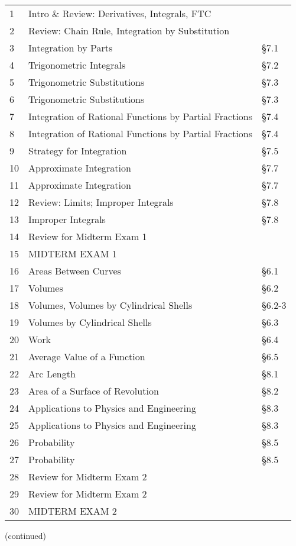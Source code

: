 \documentclass[11pt]{article}
\begin{document}
\begin{tabular}{|l|l|l|}
1 & Intro \& Review: Derivatives, Integrals, FTC & \\
2 & Review: Chain Rule, Integration by Substitution & \\
3 &Integration by Parts  & \S7.1 \\
4 &Trigonometric Integrals & \S 7.2 \\
5&Trigonometric Substitutions& \S7.3 \\
6&Trigonometric Substitutions& \S7.3 \\
7& Integration of Rational Functions by Partial Fractions& \S7.4 \\ 
8& Integration of Rational Functions by Partial Fractions& \S7.4 \\ 
9&Strategy for Integration& \S7.5 \\
10&Approximate Integration& \S7.7 \\
11&Approximate Integration& \S7.7 \\ 
12&Review: Limits; Improper Integrals& \S7.8 \\
13 &Improper Integrals& \S7.8 \\ 
14& Review for Midterm Exam 1& \\
\hline
15& MIDTERM EXAM 1&   \\
\hline
16&Areas Between Curves& \S6.1 \\
17&Volumes& \S6.2 \\ 
18&Volumes, Volumes by Cylindrical Shells& \S6.2-3 \\
19&Volumes by Cylindrical Shells& \S6.3 \\ 
20&Work& \S 6.4\\
21&Average Value of a Function& \S 6.5\\
22&Arc Length& \S 8.1\\
23&Area of a Surface of Revolution& \S 8.2 \\
24&Applications to Physics and Engineering& \S 8.3\\
25&Applications to Physics and Engineering& \S 8.3\\
26&Probability& \S 8.5\\
27&Probability& \S 8.5\\
28&Review for Midterm Exam 2&  \\
29&Review for Midterm Exam 2& \\
\hline
30&MIDTERM EXAM 2&  \\
\hline
\end{tabular}

(continued)
\end{document}

